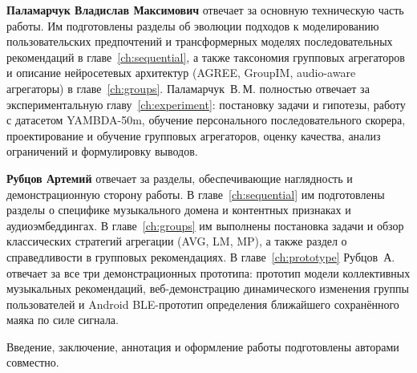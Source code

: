 \textbf{Паламарчук Владислав Максимович} отвечает за основную техническую часть работы. Им подготовлены разделы об эволюции подходов к моделированию пользовательских предпочтений и трансформерных моделях последовательных рекомендаций в главе~\ref{ch:sequential}, а также таксономия групповых агрегаторов и описание нейросетевых архитектур (AGREE, GroupIM, audio-aware агрегаторы) в главе~\ref{ch:groups}. Паламарчук~В.\,М. полностью отвечает за экспериментальную главу~\ref{ch:experiment}: постановку задачи и гипотезы, работу с датасетом YAMBDA-50m, обучение персонального последовательного скорера, проектирование и обучение групповых агрегаторов, оценку качества, анализ ограничений и формулировку выводов.

\textbf{Рубцов Артемий} отвечает за разделы, обеспечивающие наглядность и демонстрационную сторону работы. В главе~\ref{ch:sequential} им подготовлены разделы о специфике музыкального домена и контентных признаках и аудиоэмбеддингах. В главе~\ref{ch:groups} им выполнены постановка задачи и обзор классических стратегий агрегации (AVG, LM, MP), а также раздел о справедливости в групповых рекомендациях. В главе~\ref{ch:prototype} Рубцов~А. отвечает за все три демонстрационных прототипа: прототип модели коллективных музыкальных рекомендаций, веб-демонстрацию динамического изменения группы пользователей и Android BLE-прототип определения ближайшего сохранённого маяка по силе сигнала.

Введение, заключение, аннотация и оформление работы подготовлены авторами совместно.
